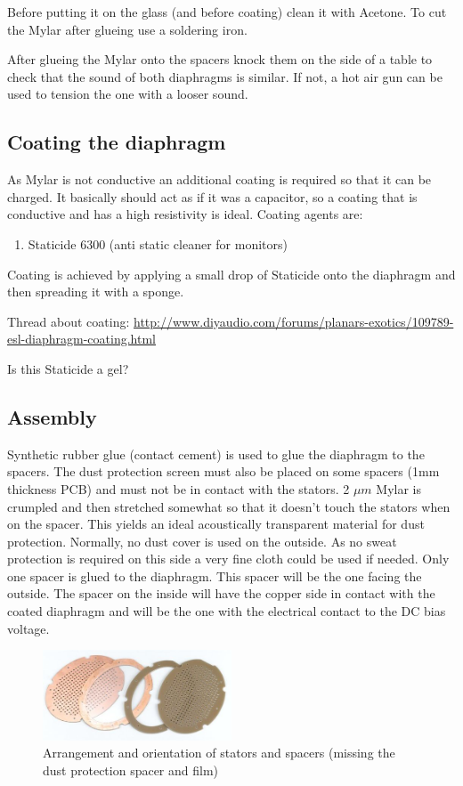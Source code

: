 \documentclass{article}
\begin{document}
Before putting it on the glass (and before coating) clean it with Acetone. To cut the Mylar after glueing use a soldering iron.

After glueing the Mylar onto the spacers knock them on the side of a table to check that the sound of both diaphragms is similar. If not, a hot air gun can be used to tension the one with a looser sound.

\subsection{Coating the diaphragm}
As Mylar is not conductive an additional coating is required so that it can be charged. It basically should act as if it was a capacitor, so a coating that is conductive and has a high resistivity is ideal. Coating agents are:
\begin{enumerate}
    \item Staticide 6300 (anti static cleaner for monitors)
\end{enumerate}
Coating is achieved by applying a small drop of Staticide onto the diaphragm and then spreading it with a sponge.

Thread about coating: \url{http://www.diyaudio.com/forums/planars-exotics/109789-esl-diaphragm-coating.html}

Is this Staticide a gel?

\subsection{Assembly}
\label{s:driver:assembly}
Synthetic rubber glue (contact cement) is used to glue the diaphragm to the spacers. The dust protection screen must also be placed on some spacers (1mm thickness PCB) and must not be in contact with the stators. 2 $\mu m$ Mylar is crumpled and then stretched somewhat so that it doesn't touch the stators when on the spacer. This yields an ideal acoustically transparent material for dust protection. Normally, no dust cover is used on the outside. As no sweat protection is required on this side a very fine cloth could be used if needed. Only one spacer is glued to the diaphragm. This spacer will be the one facing the outside. The spacer on the inside will have the copper side in contact with the coated diaphragm and will be the one with the electrical contact to the DC bias voltage.
\begin{figure}[htb]
    \centering
    \includegraphics[width=0.5\textwidth]{images/arrangement.png}
    \caption{Arrangement and orientation of stators and spacers (missing the dust protection spacer and film)}
    \label{f:driver:assembly:arrangement}
\end{figure}
\end{document}
